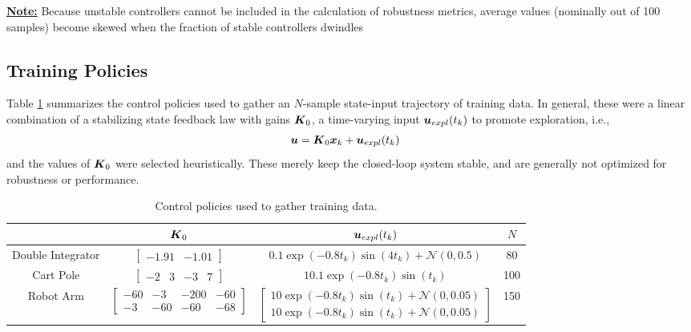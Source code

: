 \underline{\textbf{Note:}} Because unstable controllers cannot be included in the calculation of robustness metrics, average values (nominally out of 100 samples) become skewed when the fraction of stable controllers dwindles

\subsection{Training Policies}
Table \ref{table:training_policies} summarizes the control policies used to gather an $N$-sample state-input trajectory of training data.  In general, these were a linear combination of a stabilizing state feedback law with gains $\vb*{K}_{0}$, a time-varying input $\vb*{u}_{expl}(t_{k})$ to promote exploration, i.e.,
\begin{equation}
\begin{aligned}
	\vb*{u} &= \vb*{K}_{0}\vb*{x}_{k} + \vb*{u}_{expl}(t_{k})
\end{aligned}
\end{equation}
and the values of $\vb*{K}_{0}$ were selected heuristically.   These merely keep the closed-loop system stable, and are generally not optimized for robustness or performance.
\begin{table}[H]
\caption{Control policies used to gather training data.}
\centering
\begin{tabular}{|c || c | c | c|} 
	\hline
	 & $\vb*{K}_{0}$ & $\vb*{u}_{expl}(t_{k})$ & $N$\\
	\hline\hline
	Double Integrator & $\begin{bmatrix} -1.91 & -1.01\end{bmatrix}$ & $0.1\exp(-0.8t_{k})\sin(4t_{k}) + \mathcal{N}(0, 0.5)$ & 80\\ 
	\hline
	Cart Pole & $\begin{bmatrix}-2 & 3 & -3 & 7\end{bmatrix}$ & $10.1\exp(-0.8t_{k})\sin(t_{k})$ & 100\\
	\hline
	Robot Arm & $\begin{bmatrix}-60 & -3 & -200 & -60\\ -3 & -60 & -60 & -68\end{bmatrix}$ & $\begin{bmatrix}
		10\exp(-0.8t_{k})\sin(t_{k}) + \mathcal{N}(0, 0.05)\\ 10\exp(-0.8t_{k})\sin(t_{k}) + \mathcal{N}(0, 0.05) \end{bmatrix}$ & 150\\
	\hline
\end{tabular}
\label{table:training_policies}
\end{table}

